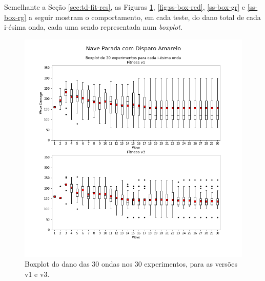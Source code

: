 Semelhante a Seção \ref{sec:td-fit-res}, as Figuras \ref{fig:ss-box-green}, \ref{fig:ss-box-red}, \ref{ss-box-gr} e \ref{ss-box-rg} a seguir mostram o comportamento, em cada teste, do dano total de cada i-ésima onda, cada uma sendo representada num \textit{boxplot}.

\begin{figure}
  \centering
  \includegraphics[width=1.1\textwidth]{figuras/ss/boxplot Nave Parada com Disparo Amarelo.png}
  \caption{Boxplot do dano das 30 ondas nos 30 experimentos, para as versões v1 e v3.}
  \label{fig:ss-box-green}
\end{figure}


